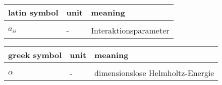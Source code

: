 \documentclass[../thesis.tex]{subfiles}
\begin{document}
	

\renewcommand*{\arraystretch}{1.2}
\small
\begin{tabular}{p{4cm}p{3cm}p{8cm}}
	latin symbol & unit & meaning \\ 
	\hline \\[\dimexpr-\normalbaselineskip+2pt]
	$a_{ii}$ & - & Interaktionsparameter 
\end{tabular}
\vspace{1cm}

\small
\begin{tabular}{p{4cm}p{3cm}p{8cm}}
	greek symbol & unit & meaning \\
	\hline \\[\dimexpr-\normalbaselineskip+2pt] 
	$\alpha$ & - & dimensionslose Helmholtz-Energie \\
\end{tabular}

\listoffigures
\listoftables
\end{document}
